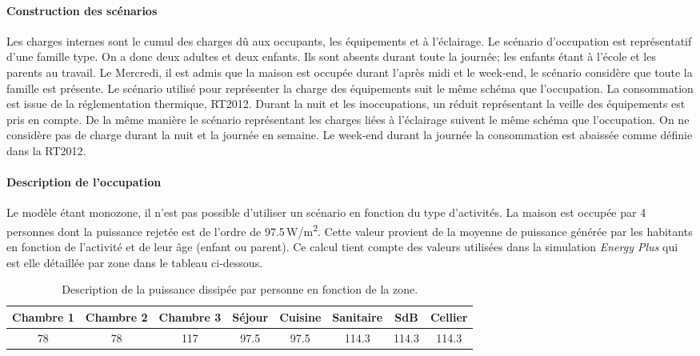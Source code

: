 \paragraph{Construction des scénarios} %
\label{par:construction_des_scenarios}
Les charges internes sont le cumul des charges dû aux occupants, les équipements et à l’éclairage.
Le scénario d’occupation est représentatif d’une famille type.
On a donc deux adultes et deux enfants. Ils sont absents durant toute la journée;
les enfants étant à l’école et les parents au travail. Le Mercredi, il est admis que
la maison est occupée durant l’après midi et le week-end, le scénario
considère que toute la famille est présente.
Le scénario utilisé pour représenter la charge des équipements suit le même schéma que
l’occupation. La consommation est issue de la réglementation thermique, RT2012. Durant la nuit et les
inoccupations, un réduit représentant la veille des équipements est pris en compte.
De la même manière le scénario représentant les charges liées à l’éclairage suivent
le même schéma que l’occupation. On ne considère pas de charge durant la nuit et la
journée en semaine. Le week-end durant la journée la consommation est abaissée comme
définie dans la RT2012.

\paragraph{Description de l’occupation} %
\label{par:description_de_l_occupation}
Le modèle étant monozone, il n’est pas possible d’utiliser un scénario
en fonction du type d’activités. La maison est occupée
par 4 personnes dont la puissance rejetée est de l’ordre de 97.5\,\si{W/m^{2}}.
Cette valeur provient de la moyenne de puissance générée par
les habitants en fonction de l’activité et de leur âge (enfant ou parent).
Ce calcul tient compte des valeurs utilisées dans la simulation \emph{Energy Plus} qui est
elle détaillée par zone dans le tableau ci-dessous.

\begin{table}
\begin{tabular}{*8{c}}
    \toprule
    Chambre 1 & Chambre 2  & Chambre 3 & Séjour & Cuisine & Sanitaire & SdB   & Cellier \\
    \midrule
    78        & 78         & 117       & 97.5   & 97.5    & 114.3     & 114.3 & 114.3   \\
    \bottomrule
\end{tabular}
\caption{Description de la puissance dissipée par personne en fonction de la zone.}
\end{table}

